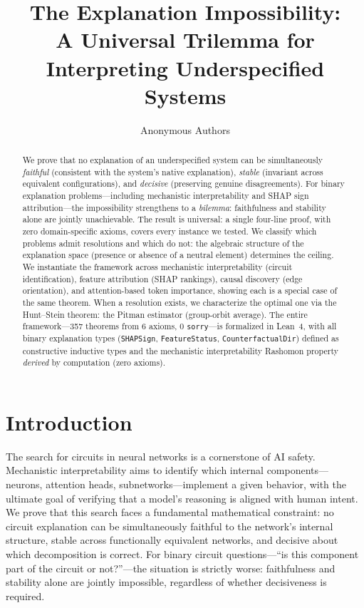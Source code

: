 \documentclass{article}
\title{The Explanation Impossibility:\\A Universal Trilemma for Interpreting Underspecified Systems}
\author{
  Anonymous Authors
}
\begin{document}
\maketitle

\begin{abstract}
We prove that no explanation of an underspecified system can be simultaneously
\emph{faithful} (consistent with the system's native explanation),
\emph{stable} (invariant across equivalent configurations), and
\emph{decisive} (preserving genuine disagreements).
For binary explanation problems---including mechanistic interpretability and
SHAP sign attribution---the impossibility strengthens to a \emph{bilemma}:
faithfulness and stability alone are jointly unachievable.
The result is universal: a single four-line proof, with zero domain-specific
axioms, covers every instance we tested.
We classify which problems admit resolutions and which do not:
the algebraic structure of the explanation space (presence or absence of a
neutral element) determines the ceiling.
We instantiate the framework across mechanistic interpretability (circuit
identification), feature attribution (SHAP rankings), causal discovery
(edge orientation), and attention-based token importance, showing each is a
special case of the same theorem.
When a resolution exists, we characterize the optimal one via the
Hunt--Stein theorem: the Pitman estimator (group-orbit average).
The entire framework---357 theorems from 6 axioms, 0 \texttt{sorry}---is formalized in
Lean~4, with all binary explanation types (\texttt{SHAPSign},
\texttt{FeatureStatus}, \texttt{CounterfactualDir}) defined as
constructive inductive types and the mechanistic interpretability
Rashomon property \emph{derived} by computation (zero axioms).
\end{abstract}

\section{Introduction}
\label{sec:intro}

The search for circuits in neural networks is a cornerstone of AI safety.
Mechanistic interpretability aims to identify which internal components---neurons,
attention heads, subnetworks---implement a given behavior, with the ultimate goal
of verifying that a model's reasoning is aligned with human intent.
We prove that this search faces a fundamental mathematical constraint:
no circuit explanation can be simultaneously faithful to the network's internal
structure, stable across functionally equivalent networks, and decisive about
which decomposition is correct.
For binary circuit questions---``is this component part of the circuit or
not?''---the situation is strictly worse: faithfulness and stability alone
are jointly impossible, regardless of whether decisiveness is required.
\end{document}
